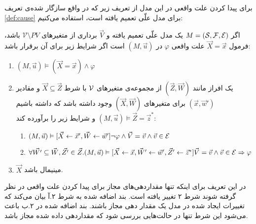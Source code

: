 برای پیدا کردن علت واقعی در این مدل از تعریف زیر که در واقع سازگار شده‌ی تعریف
\ref{def:cause}
برای مدل‌ علّی تعمیم یافته است، استفاده می‌کنیم:

\begin{definition}
    \label{def:extended}
    اگر
    $M = (\mathcal{S},\mathcal{F},\mathcal{E})$
    یک مدل علّی تعمیم یافته و
    $\vec V$
    برداری از متغیر‌های
    $\mathcal{V} \setminus PV$
    باشد،
    فرمول
    $\vec X = \vec x$
    علت واقعی
    $\varphi$
    در
    $(M,\vec{u})$
    است
    اگر شرایط زیر برای آن برقرار باشد:
    \begin{enumerate}
        \item $(M,\vec{u}) \vDash (\vec{X} = \vec{x}) \wedge \varphi$
        \item یک افراز مانند
              $(\vec{Z},\vec{W})$
              از مجموعه‌ی متغیر‌های
              $\mathcal{V}$
              با شرط
              $\vec{X} \subseteq \vec{Z}$
              و مقادیر
              $(\vec{x},\vec{w}')$
              برای متغیر‌های
              $(\vec{X},\vec{W})$
              وجود داشته باشد که داشته باشیم
              $(M,\vec{u})\vDash \vec{Z} = \vec{z}^*$
              و شرایط زیر را برآورده کند:
              \begin{enumerate}
                  \item $(M,\vec u)\vDash
                  [\vec{X}\leftarrow\vec{x}',\vec{W}\leftarrow\vec{w}'] 
                  \neg \varphi \wedge \vec V = \vec v 
                  \wedge \vec v \in \mathcal{E}$
                  \item $\forall \vec{W'} \subseteq \vec{W},\vec{Z'}\in \vec{Z}.
                            (M,\vec{u})\vDash [\vec X\leftarrow\vec x,\vec{W}'\leftarrow \vec{w}',\vec{Z}'\leftarrow \vec{z}^*]
                            \vec V = \vec v \wedge \vec v \in \mathcal{E}
                            \Rightarrow \varphi$
              \end{enumerate}
        \item $\vec X$
              مینیمال باشد.
    \end{enumerate}
\end{definition}
در این تعریف برای اینکه تنها مقداردهی‌های مجاز برای پیدا کردن علت واقعی در نظر گرفته شوند شرط ۲ تغییر یافته است.
بند اضافه شده به شرط ۲.آ بیان می‌کند که تغییرات ایجاد شده در مدل یک مقدار دهی مجاز باشند.
بند اضافه شده در ۲.ب باعث می‌شود این شرط تنها در حالت‌هایی بررسی شود که مقداردهی داده شده مجاز باشد.
